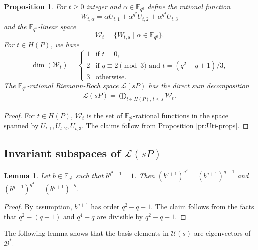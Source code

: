 \documentclass[a4paper]{amsart}
\theoremstyle{plain}
\newtheorem{lemma}[theorem]{Lemma}
\newtheorem{proposition}[theorem]{Proposition}
\theoremstyle{definition}
\theoremstyle{remark}
\begin{document}
\begin{proposition} \label{pr:Wt-props}
For $t\geq 0$ integer and $\alpha \in \mathbb{F}_{q^6}$ define the rational function 
\[W_{t,\alpha} = \alpha U_{t,1} + \alpha^{q^2} U_{t,2} + \alpha^{q^4} U_{t,3}\]
and the $\mathbb{F}_{q^2}$-linear space
\[\mathcal{W}_t = \{W_{t,\alpha} \mid \alpha \in \mathbb{F}_{q^6}\}.\]
For $t\in H(P)$, we have
\[\dim(\mathcal{W}_t) = \begin{cases}
1 & \text{if $t=0$,} \\
2 & \text{if $q\equiv 2\pmod3$ and $t=(q^2-q+1)/3$,} \\
3 & \text{otherwise.}
\end{cases}\]
The $\mathbb{F}_{q^2}$-rational Riemann-Roch space $\mathscr{L}(sP)$ has the direct sum decomposition
\begin{align} \label{eq:LsP-decomp}
\mathscr{L}(sP) = \bigoplus_{t\in H(P), \, t\leq s} \mathcal{W}_t.
\end{align}
\end{proposition}
\begin{proof}
For $t\in H(P)$, $\mathcal{W}_t$ is the set of $\mathbb{F}_{q^2}$-rational functions in the space spanned by $U_{t,1}, U_{t,2}, U_{t,3}$. The claims follow from Proposition \ref{pr:Uti-props}. 
\end{proof}

\subsection{Invariant subspaces of $\mathscr{L}(sP)$}

\begin{lemma} \label{lm:b-q+1}
Let $b\in \mathbb{F}_{q^6}$ such that $b^{q^3+1}=1$. Then $(b^{q+1})^{q^2}=(b^{q+1})^{q-1}$ and $(b^{q+1})^{q^4}=(b^{q+1})^{-q}$.
\end{lemma}
\begin{proof}
By assumption, $b^{q+1}$ has order $q^2-q+1$. The claim follows from the facts that $q^2-(q-1)$ and $q^4-q$ are divisible by $q^2-q+1$. 
\end{proof}

The following lemma shows that the basis elements in $\mathcal{U}(s)$ are eigenvectors of $\mathcal{B}^*$. 
\end{document}
